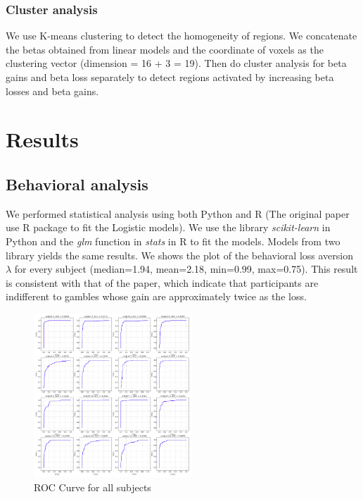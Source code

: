 \documentclass[11pt]{article}
\begin{document}
\subsubsection{Cluster analysis}

We use K-means clustering to detect the homogeneity of regions. We concatenate the betas obtained from linear models and the coordinate of voxels as the clustering vector (dimension = 16 + 3 = 19). Then do cluster analysis for beta gains and beta loss separately to detect regions activated by increasing beta losses and beta gains.


\section{Results}

\subsection{Behavioral analysis}

We performed statistical analysis using both Python and R (The original paper use R package to fit the Logistic models). We use the library \emph{scikit-learn} in Python and the \emph{glm} function in \emph{stats} in R to fit the models. Models from two library yields the same results. We shows the plot of the behavioral loss aversion $\lambda$ for every subject (median=1.94, mean=2.18, min=0.99, max=0.75). This result is consistent with that of the paper, which indicate that participants are indifferent to gambles whose gain are approximately twice as the loss. 


\begin{figure}
  \begin{center}
    \includegraphics[width=0.53\textwidth]{figures/Regression1/roc_curve.png} 
    \caption{ROC Curve for all subjects}
  \end{center}
\end{figure}
\end{document}
